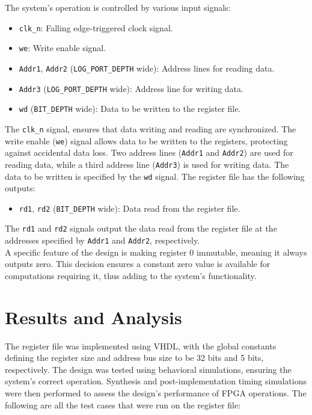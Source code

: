 \documentclass[CMPE]{../KGCOEReport}
\begin{document}
The system's operation is controlled by various input signals:

\begin{itemize}
    \item \verb|clk_n|: Falling edge-triggered clock signal.
    \item \verb|we|: Write enable signal.
    \item \verb|Addr1|, \verb|Addr2| (\verb|LOG_PORT_DEPTH| wide): Address lines for reading data.
    \item \verb|Addr3| (\verb|LOG_PORT_DEPTH| wide): Address line for writing data.
    \item \verb|wd| (\verb|BIT_DEPTH| wide): Data to be written to the register file.
\end{itemize}


The \verb|clk_n| signal, ensures that data writing and reading are synchronized. The write enable (\verb|we|) signal allows data to be written to the registers, protecting against accidental data loss. Two address lines (\verb|Addr1| and \verb|Addr2|) are used for reading data, while a third address line (\verb|Addr3|) is used for writing data. The data to be written is specified by the \verb|wd| signal. The register file has the following outputs:

\begin{itemize}
    \item \verb|rd1|, \verb|rd2| (\verb|BIT_DEPTH| wide): Data read from the register file.
\end{itemize}

The \verb|rd1| and \verb|rd2| signals output the data read from the register file at the addresses specified by \verb|Addr1| and \verb|Addr2|, respectively.
\\

A specific feature of the design is making register 0 immutable, meaning it always outputs zero. This decision ensures a constant zero value is available for computations requiring it, thus adding to the system's functionality.

\section*{Results and Analysis}

The register file was implemented using VHDL, with the global constants defining the register size and address bus size to be 32 bits and 5 bits, respectively. The design was tested using behavioral simulations, ensuring the system's correct operation. Synthesis and post-implementation timing simulations were then performed to assess the design's performance of FPGA operations.
The following are all the test cases that were run on the register file:
\end{document}
